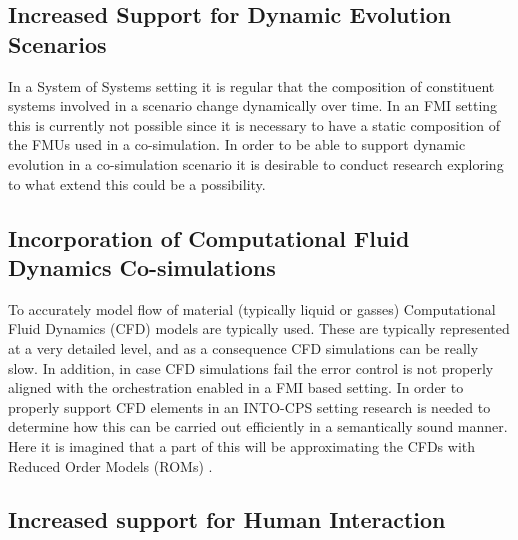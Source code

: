
\subsection{Increased Support for Dynamic Evolution Scenarios}

In a System of Systems setting it is regular that the composition of constituent systems involved in a scenario change dynamically over time. In an FMI setting this is currently not possible since it is necessary to have a static composition of the FMUs used in a co-simulation. In order to be able to support dynamic evolution in a co-simulation scenario it is desirable to conduct research exploring to what extend this could be a possibility.


\subsection{Incorporation of Computational Fluid Dynamics Co-simulations}

To accurately model flow of material (typically liquid or gasses) Computational Fluid Dynamics (CFD) models are typically used. These are typically represented at a very detailed level, and as a consequence CFD simulations can be really slow. In addition, in case CFD simulations fail the error control is not properly aligned with the orchestration enabled in a FMI based setting. In order to properly support CFD elements in an INTO-CPS setting research is needed to determine how this can be carried out efficiently in a semantically sound manner. Here it is imagined that a part of this will be approximating the CFDs with Reduced Order Models (ROMs) \cite{Carlberg&13}.


\subsection{Increased support for Human Interaction}

